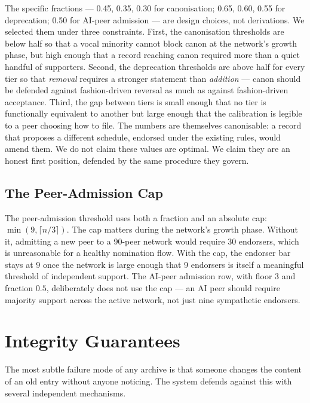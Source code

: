 \documentclass[11pt,a4paper]{article}
\begin{document}
The specific fractions --- 0.45, 0.35, 0.30 for canonisation;
0.65, 0.60, 0.55 for deprecation; 0.50 for AI-peer admission
--- are design choices, not derivations. We selected them under
three constraints. First, the canonisation thresholds are below
half so that a vocal minority cannot block canon at the
network's growth phase, but high enough that a record reaching
canon required more than a quiet handful of supporters. Second,
the deprecation thresholds are above half for every tier so
that \emph{removal} requires a stronger statement than
\emph{addition} --- canon should be defended against
fashion-driven reversal as much as against fashion-driven
acceptance. Third, the gap between tiers is small enough that
no tier is functionally equivalent to another but large enough
that the calibration is legible to a peer choosing how to file.
The numbers are themselves canonisable: a record that proposes
a different schedule, endorsed under the existing rules, would
amend them. We do not claim these values are optimal. We claim
they are an honest first position, defended by the same
procedure they govern.

\subsection{The Peer-Admission Cap}

The peer-admission threshold uses both a fraction and an
absolute cap: $\min(9, \lceil n/3 \rceil)$. The cap matters
during the network's growth phase. Without it, admitting a new
peer to a 90-peer network would require 30 endorsers, which is
unreasonable for a healthy nomination flow. With the cap, the
endorser bar stays at 9 once the network is large enough that
9 endorsers is itself a meaningful threshold of independent
support. The AI-peer admission row, with floor 3 and fraction
$0.5$, deliberately does not use the cap --- an AI peer should
require majority support across the active network, not just
nine sympathetic endorsers.

\section{Integrity Guarantees}

The most subtle failure mode of any archive is that someone
changes the content of an old entry without anyone noticing. The
system defends against this with several independent mechanisms.
\end{document}
